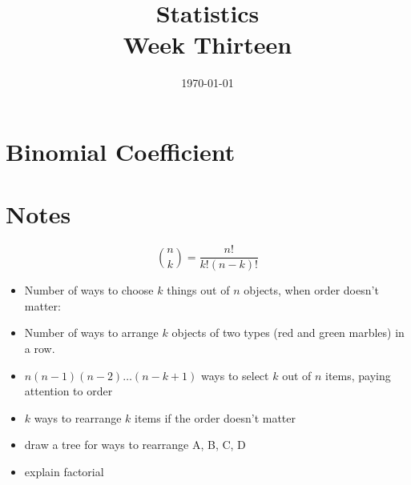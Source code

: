 \documentclass[letterpaper, landscape]{exam}
\title{Statistics \\ Week Thirteen}
\date{\today}
\author{}
\begin{document}
  \maketitle
  \tableofcontents

  \section{Binomial Coefficient}

  \section{Notes}

  \[
    \binom{n}{k} = \frac{n!}{k! (n - k)!}
  \]

  \begin{itemize}

    \item Number of ways to choose $k$ things out of $n$ objects, when order
      doesn't matter:

    \item Number of ways to arrange $k$ objects of two types (red and green
      marbles) in a row.

  \end{itemize}

  \begin{itemize}
    \item $n (n - 1)(n - 2) \dots (n - k + 1)$ ways to select $k$ out of
      $n$ items, paying attention to order

    \item $k\!$ ways to rearrange $k$ items if the order doesn't matter

    \item draw a tree for ways to rearrange A, B, C, D

    \item explain factorial
  \end{itemize}
\end{document}

